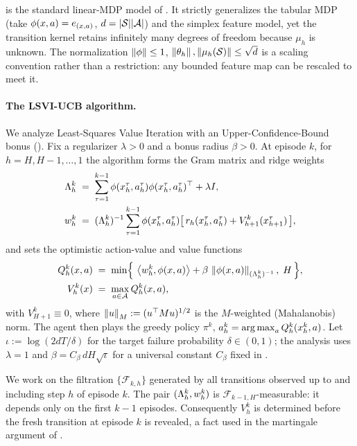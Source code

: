 \begin{remark}\label{rem:linear-mdp-mild}
 is the standard linear-MDP model of
\cite{jin2020provably}. It strictly generalizes the tabular MDP (take
$\phi(x,a)=e_{(x,a)}$, $d=|\mathcal{S}||\mathcal{A}|$) and the simplex feature model, yet
the transition kernel retains infinitely many degrees of freedom because
$\mu_h$ is unknown. The normalization $\left\| \phi \right\|\le1$,
$\left\| \theta_h \right\|,\left\| \mu_h(\mathcal{S}) \right\|\le\sqrt d$ is a scaling convention rather
than a restriction: any bounded feature map can be rescaled to meet it.
\end{remark}

\paragraph{The LSVI-UCB algorithm.}
We analyze Least-Squares Value Iteration with an Upper-Confidence-Bound bonus
(\cite{jin2020provably}). Fix a regularizer $\lambda>0$ and a bonus radius
$\beta>0$. At episode $k$, for $h=H,H-1,\dots,1$ the algorithm forms the Gram
matrix and ridge weights
\begin{align}
\Lambda_h^k &\;=\; \sum_{\tau=1}^{k-1} \phi(x_h^\tau,a_h^\tau)\phi(x_h^\tau,a_h^\tau)^\top + \lambda I, \label{eq:gram-def}\\
w_h^k &\;=\; (\Lambda_h^k)^{-1} \sum_{\tau=1}^{k-1} \phi(x_h^\tau,a_h^\tau)\big[\, r_h(x_h^\tau,a_h^\tau) + V_{h+1}^k(x_{h+1}^\tau) \,\big], \label{eq:weight-def}
\end{align}
and sets the optimistic action-value and value functions
\begin{align}
Q_h^k(x,a) &\;=\; \min\!\Big\{\, \left\langle w_h^k, \phi(x,a) \right\rangle + \beta\,\left\| \phi(x,a) \right\|_{(\Lambda_h^k)^{-1}},\; H \,\Big\}, \label{eq:Q-def}\\
V_h^k(x) &\;=\; \max_{a\in\mathcal{A}} Q_h^k(x,a), \label{eq:V-def}
\end{align}
with $V_{H+1}^k\equiv 0$, where $\left\| u \right\|_{M}:=(u^\top M u)^{1/2}$ is the
$M$-weighted (Mahalanobis) norm. The agent then plays the greedy policy
$\pi^k$, $a_h^k=\operatorname*{arg\,max}_{a} Q_h^k(x_h^k,a)$. Let $\iota:=\log(2dT/\delta)$ for
the target failure probability $\delta\in(0,1)$; the analysis uses $\lambda=1$
and $\beta=C_\beta\,dH\sqrt{\iota}$ for a universal constant $C_\beta$ fixed in
.

\begin{remark}\label{rem:filtration}
We work on the filtration $\{\mathcal F_{k,h}\}$ generated by all transitions
observed up to and including step $h$ of episode $k$. The pair
$(\Lambda_h^k,w_h^k)$ is $\mathcal F_{k-1,H}$-measurable: it depends only on the
first $k-1$ episodes. Consequently $V_h^k$ is determined before the fresh
transition at episode $k$ is revealed, a fact used in the martingale argument
of .
\end{remark}

